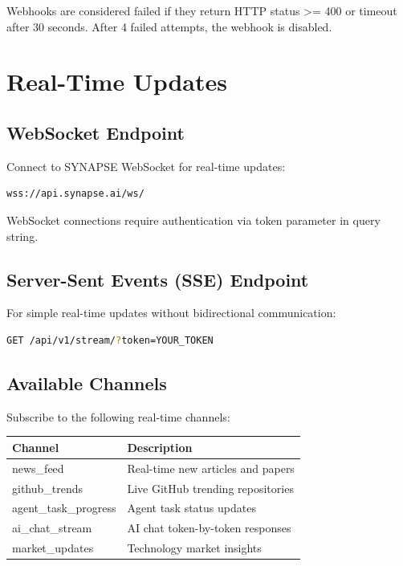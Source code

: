 \documentclass{report}
\begin{document}
Webhooks are considered failed if they return HTTP status \textgreater= 400 or timeout after 30 seconds. After 4 failed attempts, the webhook is disabled.

\chapter{Real-Time Updates}

\section{WebSocket Endpoint}

Connect to SYNAPSE WebSocket for real-time updates:

\begin{lstlisting}[language=bash]
wss://api.synapse.ai/ws/
\end{lstlisting}

WebSocket connections require authentication via token parameter in query string.

\section{Server-Sent Events (SSE) Endpoint}

For simple real-time updates without bidirectional communication:

\begin{lstlisting}[language=bash]
GET /api/v1/stream/?token=YOUR_TOKEN
\end{lstlisting}

\section{Available Channels}

Subscribe to the following real-time channels:

\begin{center}
\begin{tabular}{lp{5cm}}
\toprule
\textbf{Channel} & \textbf{Description} \\
\midrule
news\_feed & Real-time new articles and papers \\
github\_trends & Live GitHub trending repositories \\
agent\_task\_progress & Agent task status updates \\
ai\_chat\_stream & AI chat token-by-token responses \\
market\_updates & Technology market insights \\
\bottomrule
\end{tabular}
\end{center}
\end{document}
